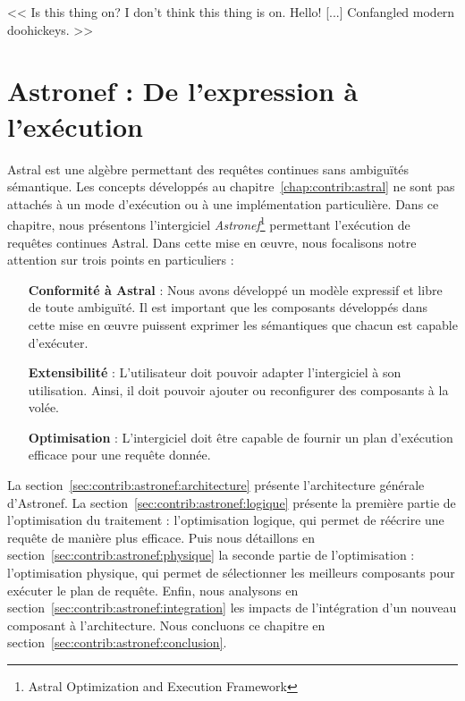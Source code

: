 \begin{savequote}[6cm]
<< Is this thing on? I don't think this thing is on. Hello! [...] Confangled modern doohickeys. >>
\end{savequote}

\chapter{Astronef : De l'expression à l'exécution}\label{chap:contrib:astronef}
\chaptertoc

Astral est une algèbre permettant des requêtes continues sans ambiguïtés sémantique. Les concepts développés au chapitre~\ref{chap:contrib:astral} ne sont pas attachés à un mode d'exécution ou à une implémentation particulière. Dans ce chapitre, nous présentons l'intergiciel \textit{Astronef}\footnote{Astral Optimization and Execution Framework} permettant l'exécution de requêtes continues Astral. Dans cette mise en œuvre, nous focalisons notre attention sur trois points en particuliers :
\begin{itemize}
	\item[\textbf{Conformité à Astral}] : Nous avons développé un modèle expressif et libre de toute ambiguïté. Il est important que les composants développés dans cette mise en œuvre puissent exprimer les sémantiques que chacun est capable d'exécuter.
	\item[\textbf{Extensibilité}] : L'utilisateur doit pouvoir adapter l'intergiciel à son utilisation. Ainsi, il doit pouvoir ajouter ou reconfigurer des composants à la volée.
	\item[\textbf{Optimisation}] : L'intergiciel doit être capable de fournir un plan d'exécution efficace pour une requête donnée.
\end{itemize}

La section~\ref{sec:contrib:astronef:architecture} présente l'architecture générale d'Astronef. La section~\ref{sec:contrib:astronef:logique} présente la première partie de l'optimisation du traitement : l'optimisation logique, qui permet de réécrire une requête de manière plus efficace. Puis nous détaillons en section~\ref{sec:contrib:astronef:physique} la seconde partie de l'optimisation : l'optimisation physique, qui permet de sélectionner les meilleurs composants pour exécuter le plan de requête. Enfin, nous analysons en section~\ref{sec:contrib:astronef:integration} les impacts de l'intégration d'un nouveau composant à l'architecture. Nous concluons ce chapitre en section~\ref{sec:contrib:astronef:conclusion}.

\lstset{language=PrologAstral}





